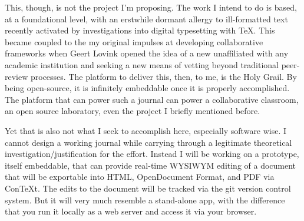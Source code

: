 This, though, is not the project I'm proposing. The work I intend
to do is based, at a foundational level, with an erstwhile dormant
allergy to ill-formatted text recently activated by investigations
into digital typesetting with TeX. This became coupled to the my
original impulses at developing collaborative frameworks when Geert
Lovink opened the idea of a new  unaffiliated
with any academic institution and seeking a new means of vetting
beyond traditional peer-review processes. The platform to deliver
this, then, to me, is the Holy Grail. By being open-source, it is
infinitely embeddable once it is properly accomplished. The
platform that can power such a journal can power a collaborative
classroom, an open source laboratory, even the project I briefly
mentioned before.

Yet that is also not what I seek to accomplish here, especially
software wise. I cannot design a working journal while carrying
through a legitimate theoretical investigation/justification for
the effort. Instead I will be working on a prototype, itself
embeddable, that can provide real-time WYSIWYM editing of a
document that will be exportable into HTML, OpenDocument Format,
and PDF via ConTeXt. The edits to the document will be tracked via
the git version control system. But it will very much resemble a
stand-alone app, with the difference that you run it locally as a
web server and access it via your browser.
